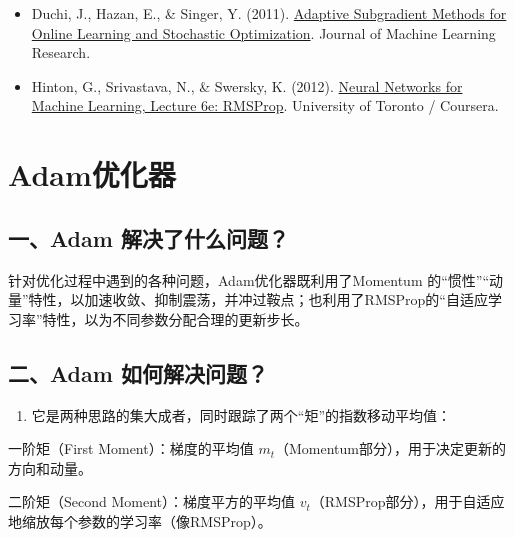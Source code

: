 \vspace{0.25em}
\begin{itemize}
\tightlist
\item
  Duchi, J., Hazan, E., \& Singer, Y. (2011). \href{https://jmlr.org/papers/v12/duchi11a.html}{Adaptive Subgradient Methods for Online Learning and Stochastic Optimization}. Journal of Machine Learning Research.
\item
  Hinton, G., Srivastava, N., \& Swersky, K. (2012). \href{https://www.cs.toronto.edu/~tijmen/csc321/slides/lecture_slides_lec6.pdf}{Neural Networks for Machine Learning, Lecture 6e: RMSProp}. University of Toronto / Coursera.
\end{itemize}

\clearpage

\hypertarget{adamux4f18ux5316ux5668}{%
\section{Adam优化器}\label{adamux4f18ux5316ux5668}}

\hypertarget{ux4e00adam-ux89e3ux51b3ux4e86ux4ec0ux4e48ux95eeux9898}{%
\subsection{一、Adam 解决了什么问题？}\label{ux4e00adam-ux89e3ux51b3ux4e86ux4ec0ux4e48ux95eeux9898}}

针对优化过程中遇到的各种问题，Adam优化器既利用了Momentum 的``惯性''``动量''特性，以加速收敛、抑制震荡，并冲过鞍点；也利用了RMSProp的``自适应学习率''特性，以为不同参数分配合理的更新步长。

\hypertarget{ux4e8cadam-ux5982ux4f55ux89e3ux51b3ux95eeux9898}{%
\subsection{二、Adam 如何解决问题？}\label{ux4e8cadam-ux5982ux4f55ux89e3ux51b3ux95eeux9898}}

\begin{enumerate}
\def\labelenumi{\arabic{enumi}.}
\tightlist
\item
  它是两种思路的集大成者，同时跟踪了两个``矩''的指数移动平均值：
\end{enumerate}

一阶矩（First Moment）：梯度的平均值 \(m_t\)（Momentum部分），用于决定更新的方向和动量。

二阶矩（Second Moment）：梯度平方的平均值 \(v_t\)（RMSProp部分），用于自适应地缩放每个参数的学习率（像RMSProp）。

